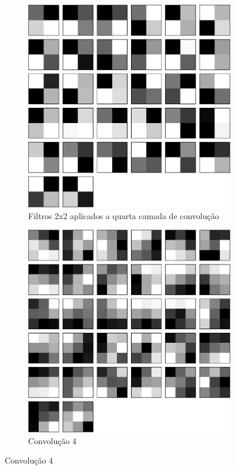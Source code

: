 \documentclass[
	12pt,				%
	oneside,			%
	a4paper,			%
	english,			%
	french,				%
	spanish,			%
	brazil,				%
	]{abntex2}
\begin{document}
\begin{center}
\begin{figure}
	\begin{subfigure}{.8\textwidth}
		\centering
		\includegraphics[width=.6\linewidth]{images/fabio/resultados/network_3/filter_convolution2d_4}%
		\caption{Filtros 2x2 aplicados a quarta camada de convolução}		
		\label{fig:filtros2x2_4}	
	\end{subfigure}%
	
	\begin{subfigure}{.8\textwidth}
		\centering
		\includegraphics[width=.6\linewidth]{images/fabio/resultados/network_3/input_1_layer_convolution2d_4}
		\caption{Convolução 4}
	\end{subfigure}%
	

\end{figure}
\end{center}
\end{document}
